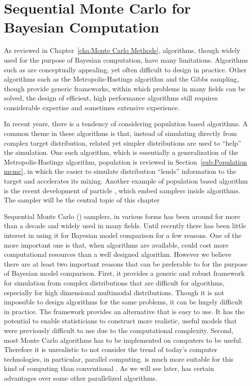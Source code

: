 \chapter{Sequential Monte Carlo for Bayesian Computation}
\label{cha:Sequential Monte Carlo for Bayesian Computation}

As reviewed in Chapter~\ref{cha:Monte Carlo Methods}, \mcmc algorithms, though
widely used for the purpose of Bayesian computation, have many limitations.
Algorithms such as \rjmcmc are conceptually appealing, yet often difficult to
design in practice. Other algorithms such as the Metropolis-Hastings algorithm
and the Gibbs sampling, though provide generic frameworks, within which
problems in many fields can be solved, the design of efficient, high
performance algorithms still requires considerable expertise and sometimes
extensive experience.

In recent years, there is a tendency of considering population based
algorithms. A common theme in these algorithms is that, instead of simulating
directly from complex target distribution, related yet simpler distributions
are used to ``help'' the simulation. One such algorithm, which is essentially
a generalization of the Metropolis-Hastings algorithm, population \mcmc is
reviewed in Section~\ref{sub:Population mcmc}, in which the easier to simulate
distribution ``lends'' information to the target and accelerates its mixing.
Another example of population based algorithm is the recent development of
particle \mcmc \cite{Andrieu:2010gc}, which embed \smc samplers inside \mcmc
algorithms. The \smc sampler will be the central topic of this chapter

Sequential Monte Carlo (\smc) samplers, in various forms has been around for
more than a decade and widely used in many fields. Until recently there has
been little interest in using it for Bayesian model comparison for a few
reasons. One of the more important one is that, when \mcmc algorithms are
available, \smc could cost more computational resources than a well designed
\mcmc algorithm. However we believe there are at least two important reasons
that \smc can be preferable to \mcmc for the purpose of Bayesian model
comparison. First, it provides a generic and robust framework for simulation
from complex distributions that are difficult for \mcmc algorithms, especially
for high dimensional multimodal distributions. Though it is not impossible to
design \mcmc algorithms for the same problems, it can be hugely difficult in
practice. The \smc framework provides an alternative that is easy to use. It
has the potential to enable statisticians to construct more realistic, useful
models that were previously difficult to use due to the computational
complexity. Second, most Monte Carlo algorithms has to be implemented on
computers to be useful. Therefore it is unrealistic to not consider the trend
of today's computer technologies, in particular, parallel computing. \smc is
much more suitable for this kind of computing than conventional \mcmc. As we
will see later, \smc has certain advantages over some other parallelized
algorithms.

